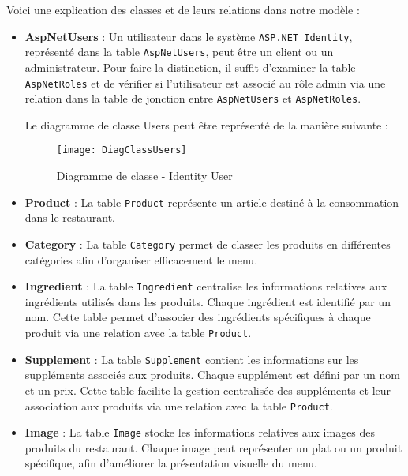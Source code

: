 Voici une explication des classes et de leurs relations dans notre modèle :
\begin{itemize}
    \item \textbf{AspNetUsers} : Un utilisateur dans le système \texttt{ASP.NET Identity}, représenté dans la table \texttt{AspNetUsers}, peut être un client ou un administrateur. Pour faire la distinction, il suffit d'examiner la table \texttt{AspNetRoles} et de vérifier si l'utilisateur est associé au rôle admin via une relation dans la table de jonction entre \texttt{AspNetUsers} et \texttt{AspNetRoles}.

    Le diagramme de classe Users peut être représenté de la manière suivante : \\
    \begin{figure}[H]
        \centering
        \texttt{[image: DiagClassUsers]}
        \caption{Diagramme de classe - Identity User}
        \label{fig:class_users}
    \end{figure}
    
    \item \textbf{Product} : La table \texttt{Product} représente un article destiné à la consommation dans le restaurant.

    \item \textbf{Category} : La table \texttt{Category} permet de classer les produits en différentes catégories afin d'organiser efficacement le menu.

    \item \textbf{Ingredient} : La table \texttt{Ingredient} centralise les informations relatives aux ingrédients utilisés dans les produits. Chaque ingrédient est identifié par un nom. Cette table permet d'associer des ingrédients spécifiques à chaque produit via une relation avec la table \texttt{Product}.

    \item \textbf{Supplement} : La table \texttt{Supplement} contient les informations sur les suppléments associés aux produits. Chaque supplément est défini par un nom et un prix. Cette table facilite la gestion centralisée des suppléments et leur association aux produits via une relation avec la table \texttt{Product}.

    \item \textbf{Image} : La table \texttt{Image} stocke les informations relatives aux images des produits du restaurant. Chaque image peut représenter un plat ou un produit spécifique, afin d'améliorer la présentation visuelle du menu.


\end{itemize}

